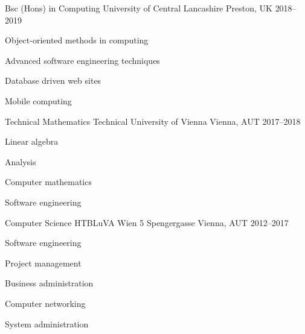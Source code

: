 

\begin{cventries}

\cventry
{Bsc (Hons) in Computing} %
{University of Central Lancashire} %
{Preston, UK} %
{2018--2019} %
{
    \begin{cvitems} %
    	\item {Object-oriented methods in computing}
        \item {Advanced software engineering techniques}
        \item {Database driven web sites}
        \item {Mobile computing}
    \end{cvitems}
}

\cventry
{Technical Mathematics} %
{Technical University of Vienna} %
{Vienna, AUT} %
{2017--2018} %
{
    \begin{cvitems} %
	    \item {Linear algebra}
		\item {Analysis}
		\item {Computer mathematics}
		\item {Software engineering}
	\end{cvitems}
}

\cventry
{Computer Science} %
{HTBLuVA Wien 5 Spengergasse} %
{Vienna, AUT} %
{2012--2017} %
{
	\begin{cvitems} %
		\item {Software engineering}
		\item {Project management}
		\item {Business administration}
		\item {Computer networking}
		\item {System administration}
	\end{cvitems}
}

\end{cventries}
